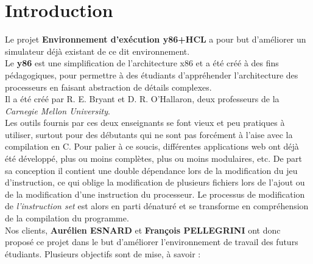 \documentclass[french]{article}
\begin{document}
\tableofcontents
\newpage

\section{Introduction}

Le projet \textbf{Environnement d'exécution y86+HCL} a pour but d'améliorer un simulateur déjà existant de ce dit environnement. \\

Le \textbf{y86} est une simplification de l'architecture x86 et a été créé à des fins pédagogiques, pour permettre à des étudiants d'appréhender l'architecture des processeurs en faisant abstraction de détails complexes. \\
Il a été créé par R. E. Bryant et D. R. O'Hallaron, deux professeurs de la \textit{Carnegie Mellon University}. \\

Les outils \cite{standalone-app} fournis par ces deux enseignants se font vieux et peu pratiques à utiliser, surtout pour des débutants qui ne sont pas forcément à l'aise avec la compilation en C. Pour palier à ce soucis, différentes applications web ont déjà été développé, plus ou moins complètes, plus ou moins modulaires, etc. De part sa conception il contient une double dépendance lors de la modification du jeu d'instruction, ce qui oblige la modification de plusieurs fichiers lors de l'ajout ou de la modification d'une instruction du processeur. Le processus de modification de \textit{l'instruction set} est alors en parti dénaturé et se transforme en compréhension de la compilation du programme.\\

Nos clients, \textbf{Aurélien ESNARD} et \textbf{François PELLEGRINI} ont donc proposé ce projet dans le but d'améliorer l'environnement de travail des futurs étudiants. Plusieurs objectifs sont de mise, à savoir : 
\end{document}
